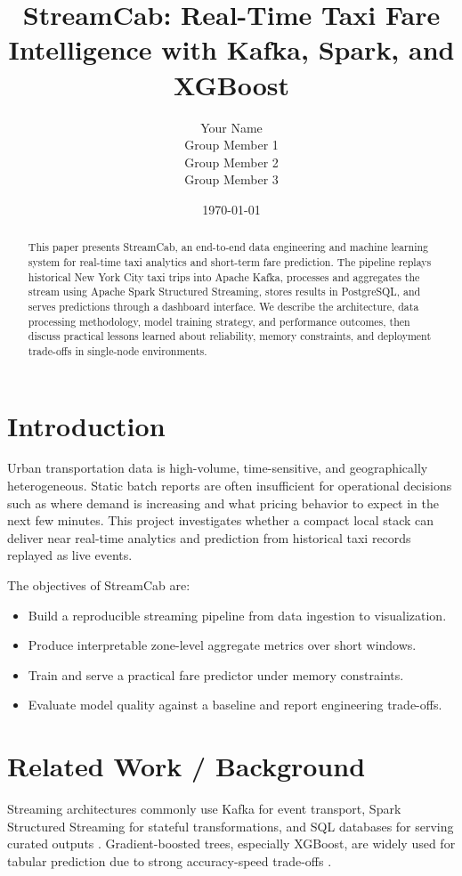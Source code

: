 \documentclass[11pt]{article}
\title{StreamCab: Real-Time Taxi Fare Intelligence with Kafka, Spark, and XGBoost}
\author{
Your Name \\
Group Member 1 \\
Group Member 2 \\
Group Member 3
}
\date{\today}
\begin{document}
\maketitle

\begin{abstract}
This paper presents StreamCab, an end-to-end data engineering and machine learning system for real-time taxi analytics and short-term fare prediction. The pipeline replays historical New York City taxi trips into Apache Kafka, processes and aggregates the stream using Apache Spark Structured Streaming, stores results in PostgreSQL, and serves predictions through a dashboard interface. We describe the architecture, data processing methodology, model training strategy, and performance outcomes, then discuss practical lessons learned about reliability, memory constraints, and deployment trade-offs in single-node environments.
\end{abstract}

\section{Introduction}
Urban transportation data is high-volume, time-sensitive, and geographically heterogeneous. Static batch reports are often insufficient for operational decisions such as where demand is increasing and what pricing behavior to expect in the next few minutes. This project investigates whether a compact local stack can deliver near real-time analytics and prediction from historical taxi records replayed as live events.

The objectives of StreamCab are:
\begin{itemize}[leftmargin=1.5em]
    \item Build a reproducible streaming pipeline from data ingestion to visualization.
    \item Produce interpretable zone-level aggregate metrics over short windows.
    \item Train and serve a practical fare predictor under memory constraints.
    \item Evaluate model quality against a baseline and report engineering trade-offs.
\end{itemize}

\section{Related Work / Background}
Streaming architectures commonly use Kafka for event transport, Spark Structured Streaming for stateful transformations, and SQL databases for serving curated outputs \cite{kafka,spark}. Gradient-boosted trees, especially XGBoost, are widely used for tabular prediction due to strong accuracy-speed trade-offs \cite{xgboost}.
\end{document}
